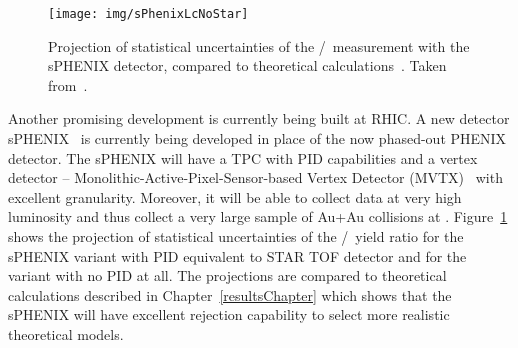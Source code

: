 \begin{figure}[!htb]
\centering
\texttt{[image: img/sPhenixLcNoStar]}
\caption[Projection of statistical uncertainties of the \Lambdac/\dzero\ measurement with the sPHENIX detector\@.]{\label{sPhenixLcProjection}Projection of statistical uncertainties of the \Lambdac/\dzero\ measurement with the sPHENIX detector, compared to theoretical calculations~\cite{CataniaLc, Tsinghua, RappLc, Monash, DIPSY}\@. Taken from~\cite{sPhenixLc}.}

\end{figure}

Another promising development is currently being built at RHIC\@. A new detector s\-PHEN\-IX~\cite{sphenix} is currently being developed in place of the now phased-out PHENIX detector. The sPHENIX will have a TPC with PID capabilities and a vertex detector -- Monolithic-Active-Pixel-Sensor-based Vertex Detector (MVTX)~\cite{sPhenixMvtx} with excellent granularity. Moreover, it will be able to collect data at very high luminosity and thus collect a very large sample of Au+Au collisions at \snnFull\@. Figure~\ref{sPhenixLcProjection} shows the projection of statistical uncertainties of the \Lambdac/\dzero\ yield ratio for the sPHENIX variant with PID equivalent to STAR TOF detector and for the variant with no PID at all. The projections are compared to theoretical calculations described in Chapter~\ref{resultsChapter} which shows that the sPHENIX will have excellent rejection capability to select more realistic theoretical models. 

% 

